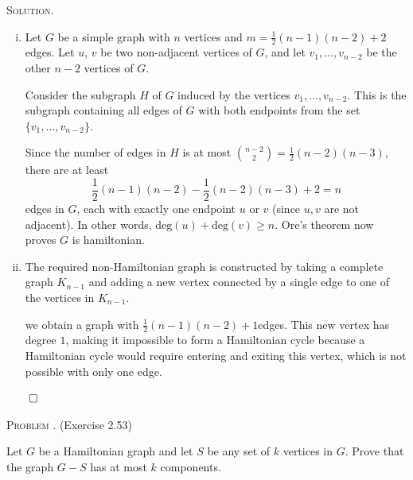 \documentclass[12pt, a4paper, oneside]{ctexart}
\newcounter{problemname}
\newenvironment{problem}{\begin{framed}\stepcounter{problemname}\par\noindent\textsc{Problem \arabic{problemname}. }}{\end{framed}\par}
\newenvironment{solution}{%
	\par\noindent\textsc{Solution. }\ignorespaces
}{%
	\hfill$\qed$\par
}
\begin{document}
	\begin{solution}
		\begin{enumerate}[(i)]
			\item Let $G$ be a simple graph with $n$ vertices and $m = \frac{1}{2}(n - 1)(n - 2) + 2$ edges. Let $u$, $v$ be two non-adjacent vertices of $G$, and let $v_1, \ldots, v_{n-2}$ be the other $n-2$ vertices of $G$.

	Consider the subgraph $H$ of $G$ induced by the vertices $v_1, \ldots, v_{n-2}$. This is the subgraph containing all edges of $G$ with both endpoints from the set $\{v_1, \ldots, v_{n-2}\}$.

	Since the number of edges in $H$ is at most $\binom{n-2}{2} = \frac{1}{2}(n - 2)(n - 3)$, there are at least
	\[
		\frac{1}{2}(n - 1)(n - 2) - \frac{1}{2}(n - 2)(n - 3) + 2 = n
	\]
	edges in $G$, each with exactly one endpoint $u$ or $v$ (since $u, v$ are not adjacent). In other words, $\text{deg}(u) + \text{deg}(v) \geq n$. Ore's theorem now proves $G$ is hamiltonian.
	
			\item The required non-Hamiltonian graph is constructed by taking a complete graph $K_{n-1}$
			  and adding a new vertex connected by a single edge to one of the vertices in $K_{n-1}$.

			  we obtain a graph with \( \frac{1}{2}(n-1)(n-2) + 1 \)edges. This new vertex has degree $1$, making it impossible to form a Hamiltonian cycle because a Hamiltonian cycle would require entering and exiting this vertex, which is not possible with only one edge.
			 
		\end{enumerate}
		

	\end{solution}

	\begin{problem}
		(Exercise 2.53) 

		Let \( G \) be a Hamiltonian graph and let \( S \) be any set of \( k \) vertices in \( G \). Prove that the graph \( G - S \) has at most \( k \) components.


	\end{problem}
\end{document}
